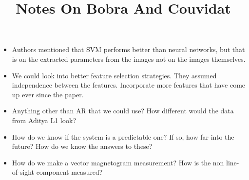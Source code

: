 \documentclass{../template/texnote}
\title{Notes On Bobra And Couvidat}
\begin{document}
    \maketitle {}
	\begin{itemize}
		\item Authors mentioned that SVM performs better than neural networks, but that is on the extracted parameters from the images not on the images themselves. 
		\item We could look into better feature selection strategies. They assumed independence between the features. Incorporate more features that have come up ever since the paper. 
		\item Anything other than AR that we could use?  How different would the data from Aditya L1 look? 
		\item How do we know if the system is a predictable one? If so, how far into the future? How do we know the answers to these?
		\item How do we make a vector magnetogram measurement? How is the non line-of-sight component measured?
	\end{itemize}

    \printbibliography
\end{document}
